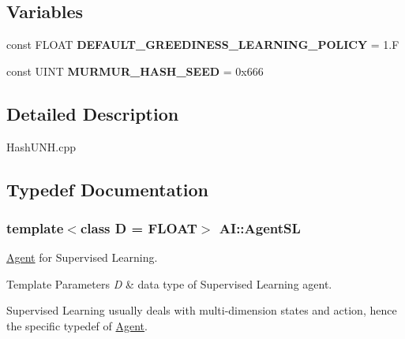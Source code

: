 \subsection*{Variables}
\begin{DoxyCompactItemize}
\item 
\hypertarget{namespaceAI_a939c510628efeee2f78c708718653f19}{const F\-L\-O\-A\-T {\bfseries D\-E\-F\-A\-U\-L\-T\-\_\-\-G\-R\-E\-E\-D\-I\-N\-E\-S\-S\-\_\-\-L\-E\-A\-R\-N\-I\-N\-G\-\_\-\-P\-O\-L\-I\-C\-Y} = 1.\-F}\label{namespaceAI_a939c510628efeee2f78c708718653f19}

\item 
\hypertarget{namespaceAI_a8909739449117cea825e57ded425e597}{const U\-I\-N\-T {\bfseries M\-U\-R\-M\-U\-R\-\_\-\-H\-A\-S\-H\-\_\-\-S\-E\-E\-D} = 0x666}\label{namespaceAI_a8909739449117cea825e57ded425e597}

\end{DoxyCompactItemize}


\subsection{Detailed Description}
Hash\-U\-N\-H.\-cpp 

\subsection{Typedef Documentation}
\hypertarget{namespaceAI_acd3da5a0aa6fc3b0e9988d4a6251bdbd}{
\subsubsection[{Agent\-S\-L}]{\setlength{\rightskip}{0pt plus 5cm}template$<$class D  = F\-L\-O\-A\-T$>$ {\bf A\-I\-::\-Agent\-S\-L}}}\label{namespaceAI_acd3da5a0aa6fc3b0e9988d4a6251bdbd}


\hyperlink{classAI_1_1Agent}{Agent} for Supervised Learning. 


\begin{DoxyTemplParams}{Template Parameters}
{\em D} & data type of Supervised Learning agent.\\
\hline
\end{DoxyTemplParams}
Supervised Learning usually deals with multi-\/dimension states and action, hence the specific typedef of \hyperlink{classAI_1_1Agent}{Agent}. 